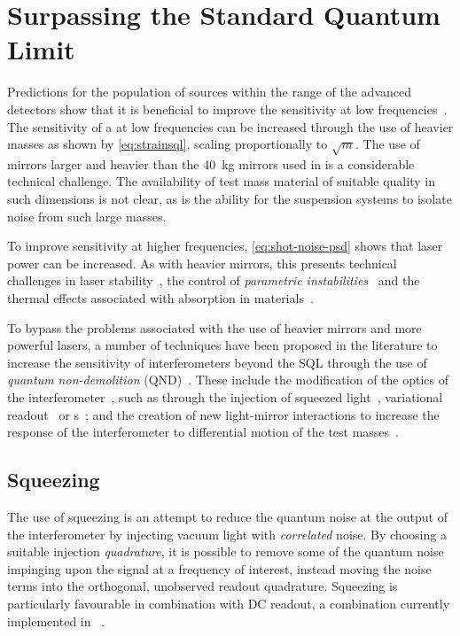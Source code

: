 \section{\label{sec:sub-sql-techniques}Surpassing the Standard Quantum Limit}
Predictions for the population of sources within the range of the advanced detectors show that it is beneficial to improve the sensitivity at low frequencies~\cite{Sathyaprakash2012}. The sensitivity of a \MI{} at low frequencies can be increased through the use of heavier masses as shown by \cref{eq:strainsql}, scaling proportionally to $\sqrt{m}$. The use of mirrors larger and heavier than the \SI{40}{\kilo\gram} mirrors used in \ALIGO{} is a considerable technical challenge. The availability of test mass material of suitable quality in such dimensions is not clear, as is the ability for the suspension systems to isolate noise from such large masses.

To improve sensitivity at higher frequencies, \cref{eq:shot-noise-psd} shows that laser power can be increased. As with heavier mirrors, this presents technical challenges in laser stability~\cite{Hildebrandt2007}, the control of \emph{parametric instabilities}~\cite{Evans2015} and the thermal effects associated with absorption in materials~\cite{Steinlechner2016}.

To bypass the problems associated with the use of heavier mirrors and more powerful lasers, a number of techniques have been proposed in the literature to increase the sensitivity of interferometers beyond the \gls{SQL} through the use of \emph{quantum non-demolition} (\gls{QND})~\cite{Braginsky1995}. These include the modification of the optics of the interferometer~\cite{Kimble2001}, such as through the injection of squeezed light~\cite{Caves1981}, variational readout~\cite{Vyatchanin1995, Vyatchanin1996} or \SM{}s~\cite{Braginsky1990}; and the creation of new light-mirror interactions to increase the response of the interferometer to differential motion of the test masses~\cite{Chen2011}.

\subsection{\label{sec:squeezing}Squeezing}
The use of squeezing is an attempt to reduce the quantum noise at the output of the interferometer by injecting vacuum light with \emph{correlated} noise. By choosing a suitable injection \emph{quadrature}, it is possible to remove some of the quantum noise impinging upon the signal at a frequency of interest, instead moving the noise terms into the orthogonal, unobserved readout quadrature. Squeezing is particularly favourable in combination with \gls{DC} readout, a combination currently implemented in \GEO{}~\cite{Willke2006, Affeldt2014}.

